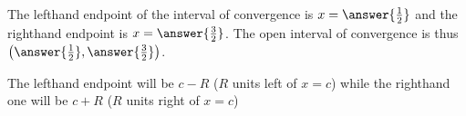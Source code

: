 \documentclass{ximera}
\begin{document}
\begin{exercise}
\begin{exercise}
\begin{exercise}
\begin{exercise}
\begin{exercise}
\begin{image}
\begin{tikzpicture}
\end{tikzpicture}
\end{image}

The lefthand endpoint of the interval of convergence is $x=\answer{\frac{1}{2}}$ and the righthand endpoint is $x= \answer{\frac{3}{2}}$.  The open interval of convergence is thus $\left(\answer{\frac{1}{2}},\answer{\frac{3}{2}}\right)$.

\begin{hint}
The lefthand endpoint will be $c-R$ ($R$ units left of $x=c$) while the righthand one will be $c+R$ ($R$ units right of $x=c$) 
\end{hint}

\end{exercise}
\end{exercise}
\end{exercise}
\end{exercise}
\end{exercise}
\end{document}
